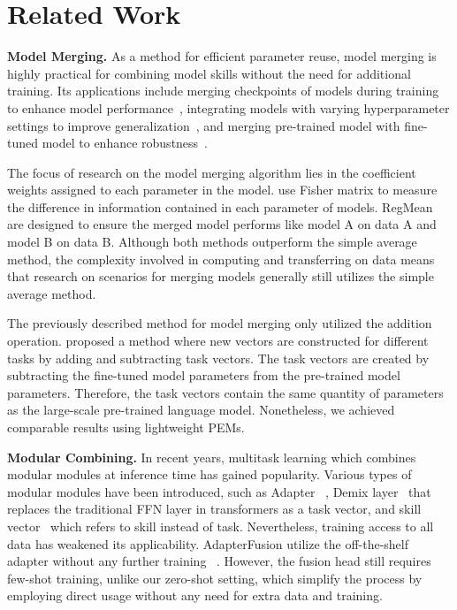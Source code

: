 
\section{Related Work}
\label{sec:relatedwork}

\textbf{Model Merging.}
As a method for efficient parameter reuse, model merging is highly practical for combining model skills without the need for additional training. Its applications include merging checkpoints of models during training to enhance model performance~\citep{Gupta2020Stochastic,wortsman2022model}, integrating models with varying hyperparameter settings to improve generalization~\citep{arpit2022ensemble,rame2022diverse}, and merging pre-trained model with fine-tuned model to enhance robustness~\citep{wortsman2022robust}.
 
The focus of research on the model merging algorithm lies in the coefficient weights assigned to each parameter in the model.
\citet{matena2022merging} use Fisher matrix to measure the difference in information contained in each parameter of models. 
RegMean\citep{jin2022dataless} are designed to ensure the merged model performs like model A on data A and model B on data B. 
Although both methods outperform the simple average method, the complexity involved in computing and transferring on data means that research on scenarios for merging models generally still utilizes the simple average method.

The previously described method for model merging only utilized the addition operation. 
\citet{ilharco2022editing} proposed a method where new vectors are constructed for different tasks by adding and subtracting task vectors. The task vectors are created by subtracting the fine-tuned model parameters from the pre-trained model parameters. Therefore, the task vectors contain the same quantity of parameters as the large-scale pre-trained language model. Nonetheless, we achieved comparable results using lightweight PEMs.

\textbf{Modular Combining. }
In recent years, multitask learning which combines modular modules at inference time has gained popularity. 
Various types of modular modules have been introduced, such as Adapter ~\citep{wang2022adamix}, Demix layer~\citep{gururangan-etal-2022-demix} that replaces the traditional FFN layer in transformers as a task vector, and skill vector~\citep{ponti2022combining} which refers to skill instead of task. Nevertheless, training access to all data has weakened its applicability.
AdapterFusion utilize the off-the-shelf adapter without any further training ~\citep{pfeiffer2021adapterfusion}. However, the fusion head still requires few-shot training, unlike our zero-shot setting, which simplify the process by employing direct usage without any need for extra data and training.


